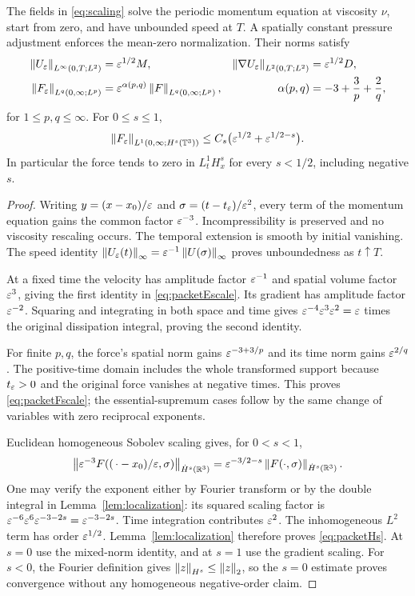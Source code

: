 \begin{proposition}\label{prop:scaling}
The fields in \eqref{eq:scaling} solve the periodic momentum equation at viscosity $\nu$, start from zero, and have unbounded speed at $T$. A spatially constant pressure adjustment enforces the mean-zero normalization. Their norms satisfy
\begin{align}
 \left\lVert U_\varepsilon\right\rVert_{L^\infty(0,T;L^2)}
    &=\varepsilon^{1/2}M,&
 \left\lVert\nabla U_\varepsilon\right\rVert_{L^2(0,T;L^2)}
    &=\varepsilon^{1/2}D,\label{eq:packetEscale}\\
 \left\lVert F_\varepsilon\right\rVert_{L^q(0,\infty;L^p)}
    &=\varepsilon^{\alpha(p,q)}\left\lVert F\right\rVert_{L^q(0,\infty;L^p)},&
 \alpha(p,q)&=-3+\frac3p+\frac2q,\label{eq:packetFscale}
\end{align}
for $1\le p,q\le\infty$. For $0\le s\le1$,
\begin{equation}\label{eq:packetHs}
 \left\lVert F_\varepsilon\right\rVert_{L^1(0,\infty;H^s(\mathbb T^3))}
 \le C_s\bigl(\varepsilon^{1/2}+\varepsilon^{1/2-s}\bigr).
\end{equation}
In particular the force tends to zero in $L^1_tH^s_x$ for every $s<1/2$, including negative $s$.
\end{proposition}
\begin{proof}
Writing $y=(x-x_0)/\varepsilon$ and $\sigma=(t-t_\varepsilon)/\varepsilon^2$, every term of the momentum equation gains the common factor $\varepsilon^{-3}$. Incompressibility is preserved and no viscosity rescaling occurs. The temporal extension is smooth by initial vanishing. The speed identity
$\left\lVert U_\varepsilon(t)\right\rVert_\infty=\varepsilon^{-1}\left\lVert U(\sigma)\right\rVert_\infty$
proves unboundedness as $t\uparrow T$.

At a fixed time the velocity has amplitude factor $\varepsilon^{-1}$ and spatial volume factor $\varepsilon^3$, giving the first identity in \eqref{eq:packetEscale}. Its gradient has amplitude factor $\varepsilon^{-2}$. Squaring and integrating in both space and time gives
$\varepsilon^{-4}\varepsilon^3\varepsilon^2=\varepsilon$ times the original dissipation integral, proving the second identity.

For finite $p,q$, the force's spatial norm gains $\varepsilon^{-3+3/p}$ and its time norm gains $\varepsilon^{2/q}$. The positive-time domain includes the whole transformed support because $t_\varepsilon>0$ and the original force vanishes at negative times. This proves \eqref{eq:packetFscale}; the essential-supremum cases follow by the same change of variables with zero reciprocal exponents.

Euclidean homogeneous Sobolev scaling gives, for $0<s<1$,
\[
 \left\lVert\varepsilon^{-3}F((\,\cdot-x_0)/\varepsilon,\sigma)\right\rVert
          _{\dot H^s(\mathbb R^3)}
 =\varepsilon^{-3/2-s}\left\lVert F(\cdot,\sigma)\right\rVert_{\dot H^s(\mathbb R^3)}.
\]
One may verify the exponent either by Fourier transform or by the double integral in Lemma~\ref{lem:localization}: its squared scaling factor is
$\varepsilon^{-6}\varepsilon^6\varepsilon^{-3-2s}=\varepsilon^{-3-2s}$.
Time integration contributes $\varepsilon^2$. The inhomogeneous $L^2$ term has order $\varepsilon^{1/2}$. Lemma~\ref{lem:localization} therefore proves \eqref{eq:packetHs}. At $s=0$ use the mixed-norm identity, and at $s=1$ use the gradient scaling. For $s<0$, the Fourier definition gives $\left\lVert z\right\rVert_{H^s}\le\left\lVert z\right\rVert_2$, so the $s=0$ estimate proves convergence without any homogeneous negative-order claim.
\end{proof}

